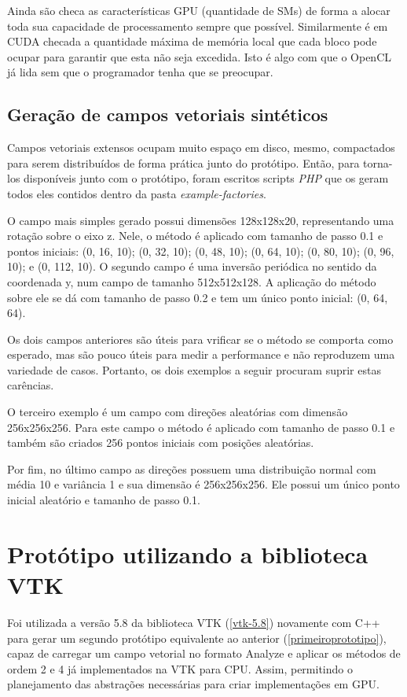     Ainda são checa as características GPU (quantidade de SMs) de forma a alocar toda sua capacidade de processamento sempre que possível. Similarmente é em CUDA checada a quantidade máxima de memória local que cada bloco pode ocupar para garantir que esta não seja excedida. Isto é algo com que o OpenCL já lida sem que o programador tenha que se preocupar.
     
  \subsection{Geração de campos vetoriais sintéticos}
  Campos vetoriais extensos ocupam muito espaço em disco, mesmo, compactados para serem distribuídos de forma prática junto do protótipo. Então, para torna-los disponíveis junto com o protótipo, foram escritos scripts \textit{PHP} que os geram todos eles contidos dentro da pasta \textit{example-factories}.
  
  O campo mais simples gerado possui dimensões 128x128x20, representando uma rotação sobre o eixo z. Nele, o método é aplicado com tamanho de passo 0.1 e pontos iniciais: (0, 16, 10); (0, 32, 10); (0, 48, 10); (0, 64, 10); (0, 80, 10); (0, 96, 10); e  (0, 112, 10). O segundo campo é uma inversão periódica no sentido da coordenada y, num campo de tamanho 512x512x128. A aplicação do método sobre ele se dá com tamanho de passo 0.2 e tem um único ponto inicial: (0, 64, 64).
  
  Os dois campos anteriores são úteis para vrificar se o método se comporta como esperado, mas são pouco úteis para medir a performance e não reproduzem uma variedade de casos. Portanto, os dois exemplos a seguir procuram suprir estas carências.
  
  O terceiro exemplo é um campo com direções aleatórias com dimensão 256x256x256. Para este campo o método é aplicado com tamanho de passo 0.1 e também são criados 256 pontos iniciais com posições aleatórias.
  
  Por fim, no último campo as direções possuem uma distribuição normal com média 10 e variância 1 e sua dimensão é 256x256x256. Ele possui um único ponto inicial aleatório e tamanho de passo 0.1.

\section{Protótipo utilizando a biblioteca VTK}
  Foi utilizada a versão 5.8 da biblioteca VTK (\ref{vtk-5.8}) novamente com C++ para gerar um segundo protótipo equivalente ao anterior (\ref{primeiroprototipo}), capaz de carregar um campo vetorial no formato Analyze e aplicar os métodos de ordem 2 e 4 já implementados na VTK para CPU. Assim, permitindo o planejamento das abstrações necessárias para criar implementações em GPU.
  
